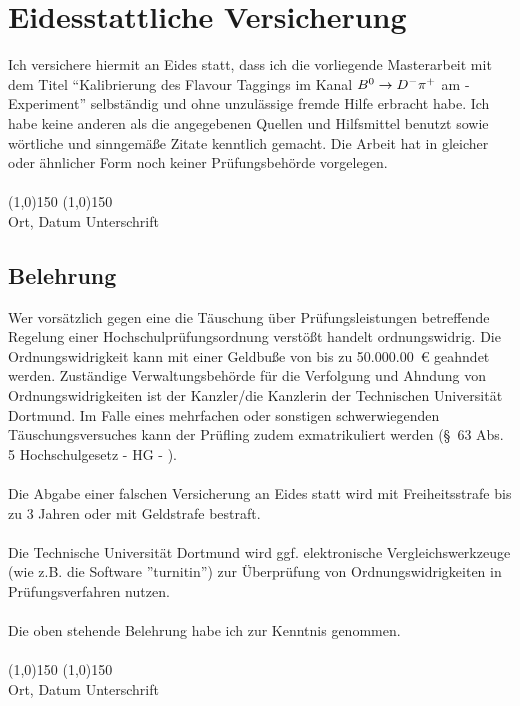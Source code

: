 \section*{Eidesstattliche Versicherung}
\vspace*{1cm}
\noindent
Ich versichere hiermit an Eides statt, dass ich die vorliegende Masterarbeit mit dem Titel \enquote{Kalibrierung des Flavour Taggings im Kanal ${{B}^0}\rightarrow{\ensuremath{{D}^-}}{\ensuremath{{\pi}^+}}$ am \lhcb- Experiment} selbst\"andig und ohne unzul\"assige fremde Hilfe erbracht habe. Ich habe keine anderen als die angegebenen
Quellen und Hilfsmittel benutzt sowie w\"ortliche und sinngem\"a\ss e Zitate kenntlich gemacht.
Die Arbeit hat in gleicher oder \"ahnlicher Form noch keiner Pr\"ufungsbeh\"orde vorgelegen.
\vspace*{1cm}
\ \\
\ \\
\line(1,0){150} \hfill \line(1,0){150}\\
Ort, Datum \hfill Unterschrift \hspace*{3cm}
\vspace*{1.5cm}

\subsection*{Belehrung}
Wer vors\"atzlich gegen eine die T\"auschung \"uber Pr\"ufungsleistungen betreffende Regelung einer Hochschulpr\"ufungsordnung
verst\"o\ss t handelt ordnungswidrig. Die Ordnungswidrigkeit kann mit einer Geldbu\ss e von bis zu \SI{50.000,00}{\euro} geahndet werden. Zust\"andige Verwaltungsbeh\"orde f\"ur die Verfolgung und Ahndung von Ordnungswidrigkeiten ist
der Kanzler/die Kanzlerin der Technischen Universit\"at Dortmund. Im Falle eines mehrfachen oder sonstigen schwerwiegenden T\"auschungsversuches kann der Pr\"ufling zudem exmatrikuliert werden (\S\ 63 Abs. 5 Hochschulgesetz - HG - ).\\
\ \\
Die Abgabe einer falschen Versicherung an Eides statt wird mit Freiheitsstrafe bis zu 3 Jahren oder mit Geldstrafe bestraft.\\
\ \\
Die Technische Universit\"at Dortmund wird ggf. elektronische Vergleichswerkzeuge (wie z.B. die Software ''turnitin'') zur \"Uberpr\"ufung von Ordnungswidrigkeiten in Pr\"ufungsverfahren nutzen.\\
\ \\
Die oben stehende Belehrung habe ich zur Kenntnis genommen.
\vspace*{1cm}
\ \\
\ \\
\line(1,0){150} \hfill \line(1,0){150}\\
Ort, Datum \hfill Unterschrift \hspace*{3cm}
\vspace*{\fill}